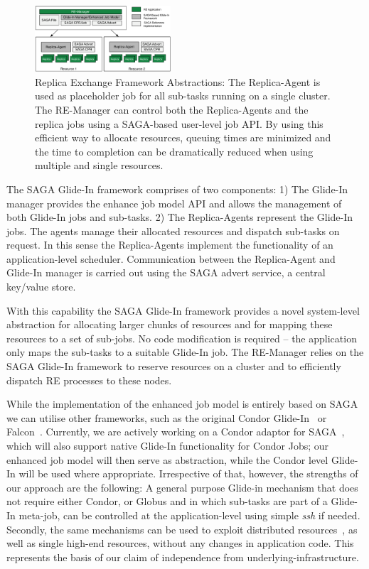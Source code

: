 \documentclass{llncs}
\begin{document}
\up
\begin{figure}[htbp]
    \centering
        \includegraphics[width=0.45\textwidth]{remdmanager_v11.pdf}
        \caption{Replica Exchange Framework Abstractions: The
          Replica-Agent is used as placeholder job for all sub-tasks
          running on a single cluster. The RE-Manager can control both
          the Replica-Agents and the replica jobs using a SAGA-based
          user-level job API. By using this efficient way to allocate
          resources, queuing times are minimized and the time to
          completion can be dramatically reduced when using multiple
          and single resources. \up}
    \label{fig:remdmanager_v11}
\end{figure}  


The SAGA Glide-In framework comprises of two components: 1) The
Glide-In manager provides the enhance job model API and allows the
management of both Glide-In jobs and sub-tasks.  2) The Replica-Agents
represent the Glide-In jobs. The agents manage their allocated
resources and dispatch sub-tasks on request. In this sense the
Replica-Agents implement the functionality of an application-level
scheduler. Communication between the Replica-Agent and Glide-In
manager is carried out using the SAGA advert service, a central
key/value store.

With this capability the SAGA Glide-In framework provides a novel
system-level abstraction for allocating larger chunks of resources and
for mapping these resources to a set of sub-jobs.%
No code modification is required -- the application only maps the
sub-tasks to a suitable Glide-In job.  The RE-Manager relies on the
SAGA Glide-In framework to reserve resources on a cluster and to
efficiently dispatch RE processes to these nodes.

While the implementation of the enhanced job model is entirely based
on SAGA %
we can utilise other frameworks, such as the original Condor
Glide-In~\cite{citeulike:291860} or Falcon~\cite{1362680}. Currently,
we are actively working on a Condor adaptor for
SAGA~\cite{saga_condor}, which will also support native Glide-In
functionality for Condor Jobs; our enhanced job model will then serve
as abstraction, while the Condor level Glide-In will be used where
appropriate.  Irrespective of that, however, the strengths of our
approach are the following: A general purpose Glide-in mechanism that
does not require either Condor, or Globus and in which sub-tasks are
part of a Glide-In meta-job, can be controlled at the
application-level using simple {\it ssh} if needed. Secondly, the same
mechanisms can be used to exploit distributed
resources~\cite{repex_ptrsa}, as well as single high-end resources,
without any changes in application code.  This represents the basis of
our claim of independence from underlying-infrastructure.
\end{document}
